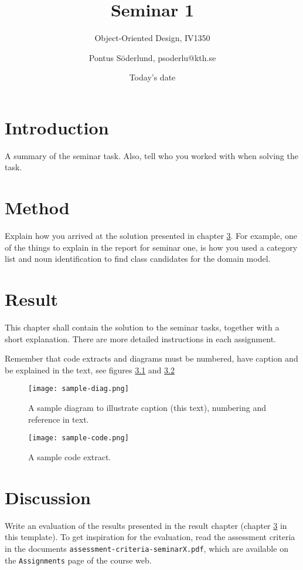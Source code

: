 \documentclass[a4paper]{scrreprt}
\title{Seminar 1}
\subtitle{Object-Oriented Design, IV1350}
\author{Pontus Söderlund, psoderlu@kth.se}
\date{Today's date}
\begin{document}
\maketitle

\tableofcontents %

\chapter{Introduction}

A summary of the seminar task. Also, tell who you worked with when solving the task. 

\chapter{Method}

Explain how you arrived at the solution presented in chapter \ref{sec:result}. For example, one of the things to explain in the report for seminar one, is how you used a category list and noun identification to find class candidates for the domain model.

\chapter{Result}
\label{sec:result}

This chapter shall contain the solution to the seminar tasks, together with a short explanation. There are more detailed instructions in each assignment.

Remember that code extracts and diagrams must be numbered, have caption and be explained in the text, see figures \ref{fig:diag} and \ref{fig:code}

\begin{figure}[h!]
  \begin{center}
    \texttt{[image: sample-diag.png]}
    \caption{A sample diagram to illustrate caption (this text), numbering and reference in text.}
    \label{fig:diag}
  \end{center}
\end{figure}

\begin{figure}[h!]
  \begin{center}
    \texttt{[image: sample-code.png]}
    \caption{A sample code extract.}
    \label{fig:code}
  \end{center}
\end{figure}

\chapter{Discussion}

Write an evaluation of the results presented in the result chapter (chapter \ref{sec:result} in this template). To get inspiration for the evaluation, read the assessment criteria in the documents \texttt{assessment-criteria-seminarX.pdf}, which are available on the \texttt{Assignments} page of the course web.
\end{document}

